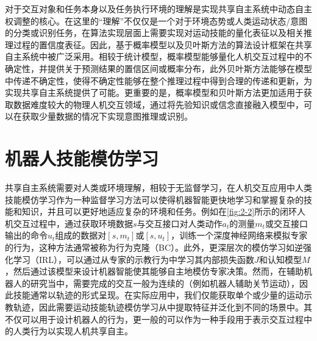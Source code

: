 对于交互对象和任务本身以及任务执行环境的理解是实现共享自主系统中动态自主权调整的核心。在这里的``理解''不仅仅是一个对于环境态势或人类运动状态/意图的分类或识别任务，在算法实现层面上需要实现对运动技能的量化表征以及相关推理过程的置信度表征。因此，基于概率模型以及贝叶斯方法的算法设计框架在共享自主系统中被广泛采用。相较于统计模型，概率模型能够量化人机交互过程中的不确定性，并提供关于预测结果的置信区间或概率分布，此外贝叶斯方法能够在模型中传递不确定性，使得不确定性能够在整个推理过程中得到合理的传递和更新，为实现共享自主系统提供了可能。更重要的是，概率模型和贝叶斯方法更加适用于获取数据难度较大的物理人机交互领域，通过将先验知识或信念直接融入模型中，可以在获取少量数据的情况下实现意图推理或识别。

\section{机器人技能模仿学习}
共享自主系统需要对人类或环境理解，相较于无监督学习，在人机交互应用中人类技能模仿学习作为一种监督学习方法可以使得机器智能更快地学习和掌握复杂的技能和知识，并且可以更好地适应复杂的环境和任务。例如在\ref{fig:2-2}所示的闭环人机交互过程中，通过获取环境数据$s$与交互接口对人类动作$a_t$的测量$m_t$或交互接口输出的命令$u_t$组成的数据对$[s,m_t]$或$[s,u_t]$，训练一个深度神经网络来模拟专家的行为，这种方法通常被称为行为克隆（BC）。此外，更深层次的模仿学习如逆强化学习（IRL），可以通过从专家的示教行为中学习其内部损失函数$J$和认知模型$M$，然后通过该模型来设计机器智能使其能够自主地模仿专家决策。然而，在辅助机器人的研究当中，需要完成的交互一般为连续的（例如机器人辅助关节运动），因此技能通常以轨迹的形式呈现。在实际应用中，我们仅能获取单个或少量的运动示教轨迹，因此需要运动技能轨迹模仿学习从中提取特征并泛化到不同的场景中。其不仅可以用于设计机器人的行为，更一般的可以作为一种手段用于表示交互过程中的人类行为以实现人机共享自主。

